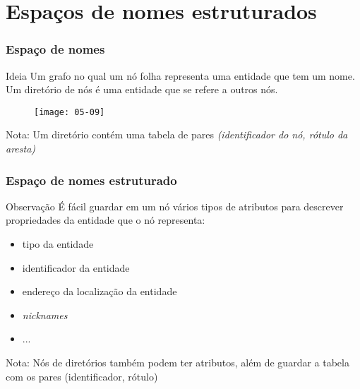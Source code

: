 \documentclass[Ligatures=TeX,table,brazil,svgnames,usetotalslideindicator,compress,10pt]{beamer}
\begin{document}

\section{Espaços de nomes estruturados}

\begin{frame}
  \frametitle{Espaço de nomes}
  \begin{block}{Ideia}
    Um grafo no qual um \alert{nó folha} representa uma entidade que tem um nome. Um \alert{diretório de nós} é uma entidade que se refere a outros nós.
  \end{block}

  \begin{figure}
    \centering
    \texttt{[image: 05-09]}
  \end{figure}

  \begin{block}{Nota:}
    Um diretório contém uma tabela de pares \emph{(identificador do nó, rótulo da aresta)}
  \end{block}
\end{frame}

\begin{frame}
  \frametitle{Espaço de nomes estruturado}
  \begin{block}{Observação}
    É fácil guardar em um nó vários tipos de atributos para descrever propriedades da entidade que o nó representa:
    \begin{itemize}
    \item tipo da entidade
    \item identificador da entidade
    \item endereço da localização da entidade
    \item \textit{nicknames}
    \item ...
    \end{itemize}
  \end{block}

  \pause
  \begin{alertblock}{Nota:}
    Nós de diretórios também podem ter atributos, além de guardar a tabela com os pares (identificador, rótulo)
  \end{alertblock}

\end{frame}
\end{document}
